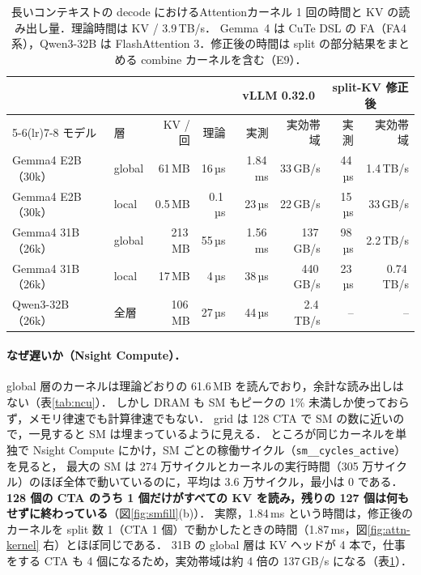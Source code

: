 \begin{table}[htbp]\centering\small
\caption{長いコンテキストの decode におけるAttentionカーネル 1 回の時間と KV の読み出し量．理論時間は KV / 3.9\,TB/s．
Gemma~4 は CuTe DSL の FA（FA4 系），Qwen3-32B は FlashAttention 3．修正後の時間は split の部分結果をまとめる combine カーネルを含む（E9）．}
\label{tab:attn-bw}
\begin{tabular}{llrrrrrr}\toprule
 & & & & \multicolumn{2}{c}{vLLM 0.32.0} & \multicolumn{2}{c}{split-KV 修正後} \\\cmidrule(lr){5-6}\cmidrule(lr){7-8}
モデル & 層 & KV / 回 & 理論 & 実測 & 実効帯域 & 実測 & 実効帯域 \\\midrule
Gemma4 E2B（30k） & global & 61\,MB & 16\,µs & 1.84\,ms & 33\,GB/s & 44\,µs & 1.4\,TB/s \\
Gemma4 E2B（30k） & local & 0.5\,MB & 0.1\,µs & 23\,µs & 22\,GB/s & 15\,µs & 33\,GB/s \\
Gemma4 31B（26k） & global & 213\,MB & 55\,µs & 1.56\,ms & 137\,GB/s & 98\,µs & 2.2\,TB/s \\
Gemma4 31B（26k） & local & 17\,MB & 4\,µs & 38\,µs & 440\,GB/s & 23\,µs & 0.74\,TB/s \\
Qwen3-32B（26k） & 全層 & 106\,MB & 27\,µs & 44\,µs & 2.4\,TB/s & -- & -- \\\bottomrule
\end{tabular}
\end{table}

\paragraph{なぜ遅いか（Nsight Compute）．}
global 層のカーネルは理論どおりの 61.6\,MB を読んでおり，余計な読み出しはない（表\ref{tab:ncu}）．
しかし DRAM も SM もピークの 1\% 未満しか使っておらず，メモリ律速でも計算律速でもない．
grid は 128 CTA で SM の数に近いので，一見すると SM は埋まっているように見える．
ところが同じカーネルを単独で Nsight Compute にかけ，SM ごとの稼働サイクル（\texttt{sm\_\_cycles\_active}）を見ると，
最大の SM は 274 万サイクルとカーネルの実行時間（305 万サイクル）のほぼ全体で動いているのに，平均は 3.6 万サイクル，最小は 0 である．
\textbf{128 個の CTA のうち 1 個だけがすべての KV を読み，残りの 127 個は何もせずに終わっている}（図\ref{fig:smfill}(b)）．
実際，1.84\,ms という時間は，修正後のカーネルを split 数 1（CTA 1 個）で動かしたときの時間（1.87\,ms，図\ref{fig:attn-kernel} 右）とほぼ同じである．
31B の global 層は KV ヘッドが 4 本で，仕事をする CTA も 4 個になるため，実効帯域は約 4 倍の 137\,GB/s になる（表\ref{tab:attn-bw}）．

